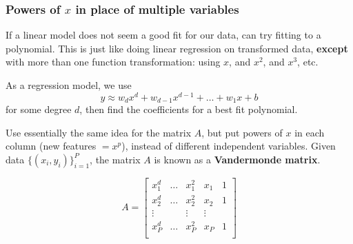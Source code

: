 \documentclass{beamer}
\theoremstyle{example}
\begin{document}
\begin{frame}
    \frametitle{Powers of $x$ in place of multiple variables}
    If a linear model does not seem a good fit for our data, can try fitting to a polynomial. This is just like doing linear regression on transformed data, {\bf except} with more than one function transformation: using $x$, and $x^2$, and $x^3$, etc.

    \pause
    As a regression model, we use 
        \[y \approx w_dx^d + w_{d-1}x^{d-1} + \ldots + w_1x + b\]
    for some degree $d$, then find the coefficients for a best fit polynomial.
    
    \pause
    Use essentially the same idea for the matrix $A$, but put powers of $x$ in each column (new features $= x^p$), instead of different independent variables. Given data $\{(x_i,y_i)\}_{i=1}^P$, the matrix $A$ is known as a \textbf{Vandermonde matrix}.
    \pause
    
    {\footnotesize
    \[A = \begin{bmatrix}x_1^d & \ldots & x_1^2 & x_1 & 1 \\ x_2^d & \ldots & x_2^2 & x_2 & 1 \\ 
        \vdots & & \vdots & \vdots \\
        x_P^d & \ldots & x_P^2 & x_P & 1 \\ \end{bmatrix}\]
    }
\end{frame}
\end{document}
